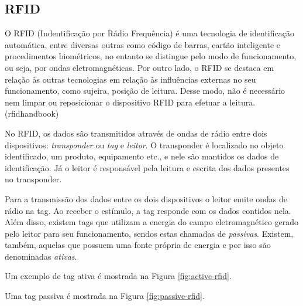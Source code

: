 \documentclass[
	article,			%
	11pt,				%
	oneside,			%
	a4paper,			%
	section=TITLE,		%
	subsection=TITLE,	%
	english,			%
	brazil,				%
	sumario=tradicional
	]{abntex2}
\begin{document}
\subsection{RFID}

O RFID (Indentificação por Rádio Frequência) é uma tecnologia de identificação automática, entre 
diversas outras como código de barras, cartão inteligente e procedimentos biométricos, no entanto 
se distingue pelo modo de funcionamento, ou seja, por ondas 
eletromagnéticas. 
Por outro lado, o RFID se destaca em relação às outras tecnologias em relação às 
influências externas no seu funcionamento, como sujeira, posição de leitura. Desse modo, não é 
necessário nem limpar ou reposicionar o dispositivo RFID para efetuar a leitura. (rfidhandbook)

No RFID, os dados são transmitidos através de ondas de rádio entre dois dispositivos: 
\textit{transponder} ou \textit{tag} e \textit{leitor}. O transponder é localizado no objeto 
identificado, um 
produto, equipamento etc., e nele são mantidos os dados de identificação. Já o leitor é responsável 
pela leitura e escrita dos dados presentes no transponder.

Para a transmissão dos dados entre os dois dispositivos o leitor emite ondas de rádio na tag. Ao 
receber o estímulo, a tag responde com os dados contidos nela. Além disso, existem tags que 
utilizam a energia do campo eletromagnético gerado pelo leitor para seu funcionamento, sendos estas 
chamadas de \textit{passivas}. Existem, também, aquelas que possuem uma fonte própria de energia e 
por isso são denominadas \textit{ativas}.

Um exemplo de tag ativa é mostrada na Figura \ref{fig:active-rfid}.


Uma tag passiva é mostrada na Figura \ref{fig:passive-rfid}.

\end{document}
